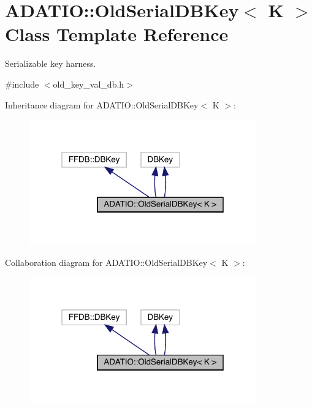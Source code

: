 \hypertarget{classADATIO_1_1OldSerialDBKey}{}\section{A\+D\+A\+T\+IO\+:\+:Old\+Serial\+D\+B\+Key$<$ K $>$ Class Template Reference}
\label{classADATIO_1_1OldSerialDBKey}


Serializable key harness.  




{\ttfamily \#include $<$old\+\_\+key\+\_\+val\+\_\+db.\+h$>$}



Inheritance diagram for A\+D\+A\+T\+IO\+:\+:Old\+Serial\+D\+B\+Key$<$ K $>$\+:
\nopagebreak
\begin{figure}[H]
\begin{center}
\leavevmode
\includegraphics[width=277pt]{da/d95/classADATIO_1_1OldSerialDBKey__inherit__graph}
\end{center}
\end{figure}


Collaboration diagram for A\+D\+A\+T\+IO\+:\+:Old\+Serial\+D\+B\+Key$<$ K $>$\+:
\nopagebreak
\begin{figure}[H]
\begin{center}
\leavevmode
\includegraphics[width=277pt]{df/dcd/classADATIO_1_1OldSerialDBKey__coll__graph}
\end{center}
\end{figure}
